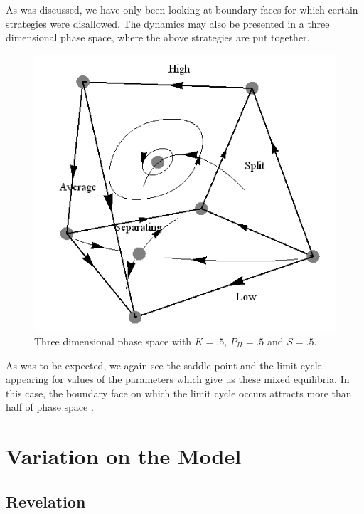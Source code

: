 \documentclass[a4paper,10pt]{article}
\numberwithin{equation}{section}
\begin{document}
As was discussed, we have only been looking at boundary faces for which certain strategies were disallowed. The dynamics may also be presented in a three dimensional phase space, where the above strategies are put together.

\begin{figure}[h]
\begin{center}
\leavevmode
\includegraphics[scale=.75]{Graph15.png}
\end{center}
\caption{Three dimensional phase space with $K=.5$, $P_H=.5$ and $S=.5$.}
\label{fig:Graph15.png}
\end{figure}

As was to be expected, we again see the saddle point and the limit cycle appearing for values of the parameters which give us these mixed equilibria. In this case, the boundary face on which the limit cycle occurs attracts more than half of phase space \cite{Wagner2010}.

\section{Variation on the Model}
\label{sec:Variation on the Model}
\subsection{Revelation}
\label{sec:Revelation}
\end{document}
